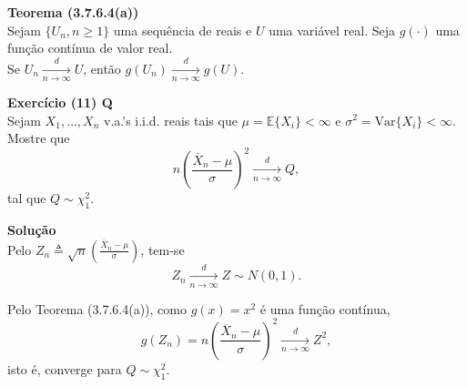 \textbf{Teorema (3.7.6.4(a))} \\
Sejam $\{U_n, n \geq 1\}$ uma sequência de reais e $U$ uma variável real. Seja $g(\cdot)$ uma função contínua de valor real. \\
Se $U_n \xrightarrow[n \to \infty]{d} U$, então $g(U_n) \xrightarrow[n \to \infty]{d} g(U)$.

\vspace{0.5cm}

\textbf{Exercício (11) Q} \\
Sejam $X_1, \dots, X_n$ v.a.'s i.i.d. reais tais que $\mu = \mathbb{E}\{X_i\} < \infty$ e $\sigma^2 = \mathrm{Var}\{X_i\} < \infty$. Mostre que
\begin{equation}
n \left( \frac{\overline{X}_n - \mu}{\sigma} \right)^2 \xrightarrow[n \to \infty]{d} Q,
\end{equation}
tal que $Q \sim \chi^2_1$.

\vspace{0.5cm}

\textbf{Solução} \\
Pelo $Z_n \triangleq \sqrt{n} \left( \frac{\overline{X}_n - \mu}{\sigma} \right)$, tem-se
\begin{equation}
Z_n \xrightarrow[n \to \infty]{d} Z \sim N(0,1).
\end{equation}

Pelo Teorema (3.7.6.4(a)), como $g(x) = x^2$ é uma função contínua,
\begin{equation}
g(Z_n) = n \left( \frac{\overline{X}_n - \mu}{\sigma} \right)^2 \xrightarrow[n \to \infty]{d} Z^2,
\end{equation}
isto é, converge para $Q \sim \chi^2_1$.